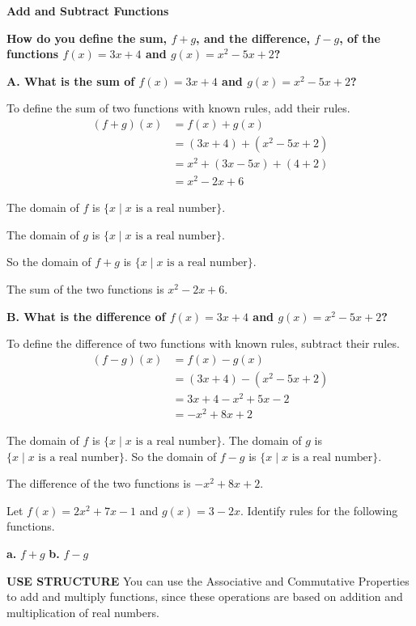 \documentclass{article}
\newenvironment{example}[1]{}{}
\newenvironment{tryit}[1]{}{}
\begin{document}
\begin{example}{1}
\textbf{Add and Subtract Functions}

\textbf{How do you define the sum, $f + g$, and the difference, $f - g$, of the functions $f(x) = 3x + 4$ and $g(x) = x^2 - 5x + 2$?}

\textbf{A. What is the sum of $f(x) = 3x + 4$ and $g(x) = x^2 - 5x + 2$?}

To define the sum of two functions with known rules, add their rules.
\begin{align*}
(f + g)(x) &= f(x) + g(x) \\
&= (3x + 4) + (x^2 - 5x + 2) \\
&= x^2 + (3x - 5x) + (4 + 2) \\
&= x^2 - 2x + 6
\end{align*}

The domain of $f$ is $\{x \mid x \text{ is a real number}\}$.

The domain of $g$ is $\{x \mid x \text{ is a real number}\}$.

So the domain of $f + g$ is $\{x \mid x \text{ is a real number}\}$.

The sum of the two functions is $x^2 - 2x + 6$.

\textbf{B. What is the difference of $f(x) = 3x + 4$ and $g(x) = x^2 - 5x + 2$?}

To define the difference of two functions with known rules, subtract their rules.
\begin{align*}
(f - g)(x) &= f(x) - g(x) \\
&= (3x + 4) - (x^2 - 5x + 2) \\
&= 3x + 4 - x^2 + 5x - 2 \\
&= -x^2 + 8x + 2
\end{align*}

The domain of $f$ is $\{x \mid x \text{ is a real number}\}$. The domain of $g$ is $\{x \mid x \text{ is a real number}\}$. So the domain of $f - g$ is $\{x \mid x \text{ is a real number}\}$.

The difference of the two functions is $-x^2 + 8x + 2$.
\end{example}

\begin{tryit}{1}
Let $f(x) = 2x^2 + 7x - 1$ and $g(x) = 3 - 2x$. Identify rules for the following functions.

\textbf{a.} $f + g$ \qquad \textbf{b.} $f - g$
\end{tryit}

\textbf{USE STRUCTURE}
You can use the Associative and Commutative Properties to add and multiply functions, since these operations are based on addition and multiplication of real numbers.
\end{document}
